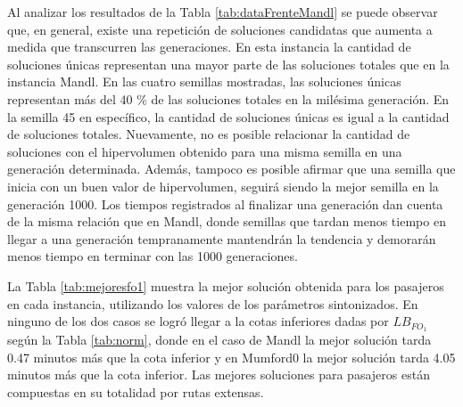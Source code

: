 Al analizar los resultados de la Tabla \ref{tab:dataFrenteMandl} se puede observar que, en general, existe una repetición de soluciones candidatas que aumenta a medida que transcurren las generaciones. En esta instancia la cantidad de soluciones únicas representan una mayor parte de las soluciones totales que en la instancia Mandl. En las cuatro semillas mostradas, las soluciones únicas representan más del 40 \% de las soluciones totales en la milésima generación. En la semilla 45 en específico, la cantidad de soluciones únicas es igual a la cantidad de soluciones totales. Nuevamente, no es posible relacionar la cantidad de soluciones con el hipervolumen obtenido para una misma semilla en una generación determinada. Además, tampoco es posible afirmar que una semilla que inicia con un buen valor de hipervolumen, seguirá siendo la mejor semilla en la generación 1000. Los tiempos registrados al finalizar una generación dan cuenta de la misma relación que en Mandl, donde semillas que tardan menos tiempo en llegar a una generación tempranamente mantendrán la tendencia y demorarán menos tiempo en terminar con las 1000 generaciones. 

La Tabla \ref{tab:mejoresfo1} muestra la mejor solución obtenida para los pasajeros en cada instancia, utilizando los valores de los parámetros sintonizados. En ninguno de los dos casos se logró llegar a la cotas inferiores dadas por $LB_{FO_1}$ según la Tabla \ref{tab:norm}, donde en el caso de Mandl la mejor solución tarda 0.47 minutos más que la cota inferior y en Mumford0 la mejor solución tarda 4.05 minutos más que la cota inferior. Las mejores soluciones para pasajeros están compuestas en su totalidad por rutas extensas.

